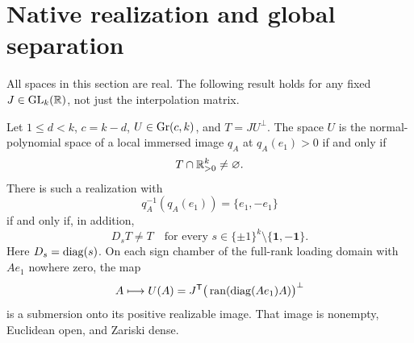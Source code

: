 \section{Native realization and global separation}\label{sec:realization}
All spaces in this section are real. The following result holds for any fixed $J\in\mathrm{GL}_k(\mathbb R)$, not just the interpolation matrix.
\begin{theorem}\label{thm:fixed-realization}
Let $1\le d<k$, $c=k-d$, $U\in\operatorname{Gr}(c,k)$, and $T=JU^\perp$. The space $U$ is the normal-polynomial space of a local immersed image $q_A$ at $q_A(e_1)>0$ if and only if
\begin{equation}\label{eq:positive}
 T\cap\mathbb R^k_{>0}\ne\varnothing.
\end{equation}
There is such a realization with
\begin{equation}\label{eq:separated-fibre}
 q_A^{-1}(q_A(e_1))=\{e_1,-e_1\}
\end{equation}
if and only if, in addition,
\begin{equation}\label{eq:no-split}
 D_sT\ne T\quad\text{for every }s\in\{\pm1\}^k\setminus\{\mathbf1,-\mathbf1\}.
\end{equation}
Here $D_s=\operatorname{diag}(s)$. On each sign chamber of the full-rank loading domain with $Ae_1$ nowhere zero, the map
\[
 A\longmapsto U(A)=J^{\mathsf T}\big(\operatorname{ran}(\operatorname{diag}(Ae_1)A)\big)^\perp
\]
is a submersion onto its positive realizable image. That image is nonempty, Euclidean open, and Zariski dense.
\end{theorem}
